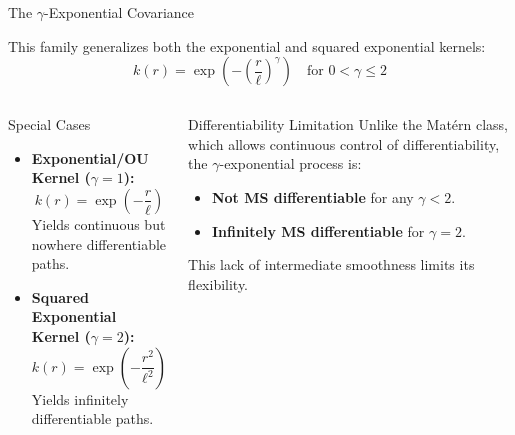 \documentclass[aspectratio=169, 10pt]{beamer}
\begin{document}
\begin{frame}{The $\gamma$-Exponential Covariance}
  
  This family generalizes both the exponential and squared exponential kernels:
  \[
    k(r) = \exp\left(-\left(\frac{r}{\ell}\right)^\gamma\right) \quad \text{for } 0 < \gamma \le 2
  \]
  
  \begin{columns}[t]
      \begin{block}{Special Cases}
        \scriptsize
        \begin{itemize}
          \item \textbf{Exponential/OU Kernel ($\gamma = 1$):}
            \[ k(r) = \exp\left(-\frac{r}{\ell}\right) \]
            Yields continuous but nowhere differentiable paths.
          \item \textbf{Squared Exponential Kernel ($\gamma = 2$):}
            \[ k(r) = \exp\left(-\frac{r^2}{\ell^2}\right) \]
            Yields infinitely differentiable paths.
        \end{itemize}
      \end{block}
      
      \begin{block}{Differentiability Limitation}
        \scriptsize
        Unlike the Matérn class, which allows continuous control of differentiability, the $\gamma$-exponential process is:
        \begin{itemize}
          \item \textbf{Not MS differentiable} for any $\gamma < 2$.
          \item \textbf{Infinitely MS differentiable} for $\gamma = 2$.
        \end{itemize}
        This lack of intermediate smoothness limits its flexibility.
      \end{block}
  \end{columns}
\end{frame}
\end{document}
